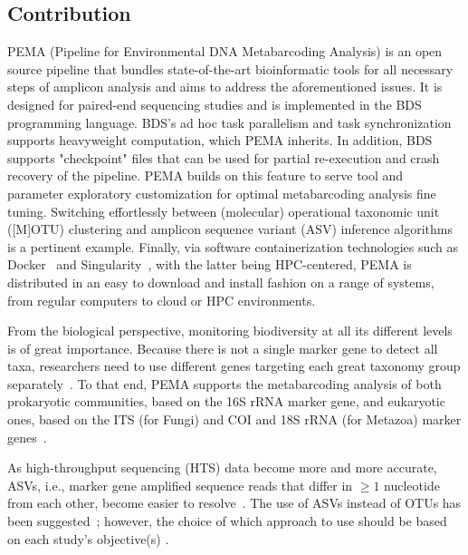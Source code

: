   \subsection{Contribution}

   PEMA (Pipeline for Environmental DNA Metabarcoding Analysis) is an open source pipeline that bundles state-of-the-art bioinformatic tools for all necessary steps of amplicon analysis and aims to address the aforementioned issues. 
   It is designed for paired-end sequencing studies and is implemented in the BDS~\cite{cingolani2015bigdatascript} programming language. 
   BDS's ad hoc task parallelism and task synchronization supports heavyweight computation, which PEMA inherits. 
   In addition, BDS supports "checkpoint" files that can be used for partial re-execution and crash recovery of the pipeline. 
   PEMA builds on this feature to serve tool and parameter exploratory customization for optimal metabarcoding analysis fine tuning.
   Switching effortlessly between (molecular) operational taxonomic unit ([M]OTU) clustering and amplicon sequence variant (ASV) inference algorithms is a pertinent example. 
   Finally, via software containerization technologies such as Docker~\cite{rad2017introduction} and Singularity~\cite{kurtzer2017singularity}, with the latter being HPC-centered, PEMA is distributed in an easy to download and install fashion on a range of systems, from regular computers to cloud or HPC environments.
   
   From the biological perspective, monitoring biodiversity at all its different levels is of great importance. Because there is not a single marker gene to detect all taxa, researchers need to use different genes targeting each great taxonomy group separately~\cite{coissac2012bioinformatic}. 
   To that end, PEMA supports the metabarcoding analysis of both prokaryotic communities, based on the 16S rRNA marker gene, and eukaryotic ones, based on the ITS (for Fungi) and COI and 18S rRNA (for Metazoa) marker genes~\cite{coissac2012bioinformatic}.
   
   As high-throughput sequencing (HTS) data become more and more accurate, ASVs, i.e., marker gene amplified sequence reads that differ in $≥1$ nucleotide from each other, become easier to resolve~\cite{callahan2017exact}. 
   The use of ASVs instead of OTUs has been suggested~\cite{callahan2017exact}; 
   however, the choice of which approach to use should be based on each study's objective(s) \cite{pauvert2019bioinformatics}.
   
